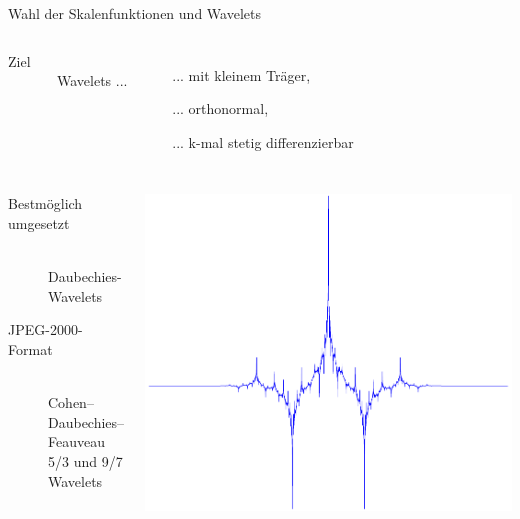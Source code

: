 	{
	\begin{frame}{Wahl der Skalenfunktionen und Wavelets}
		\begin{columns}[T, onlytextwidth]
			\alert{Ziel}\vspace{3.2mm}\\
			\ \ \ \ \ \ \ Wavelets ...
			\begin{itemize}
				\item[...] mit kleinem Träger,\item[...] orthonormal,\item[...] k-mal stetig differenzierbar
			\end{itemize}
		\end{columns}\pause
		\begin{columns}[c, onlytextwidth]
			\vspace{-6mm}
			\begin{description}
				\item[\alert{\sf Bestmöglich umgesetzt}] \ \\ \hspace{-14.4mm}Daubechies-Wavelets\vspace{3mm}\pause
				\item[\alert{\sf JPEG-2000-Format}] \ \\ \hspace{-14.4mm}Cohen–Daubechies–Feauveau\\ \hspace{-14.4mm}5/3 und 9/7 Wavelets
			\end{description}\pause
			\vspace{2mm}
			\includegraphics[width=\textwidth]{CDFWavelet.pdf}
		\end{columns}
	\end{frame}}


